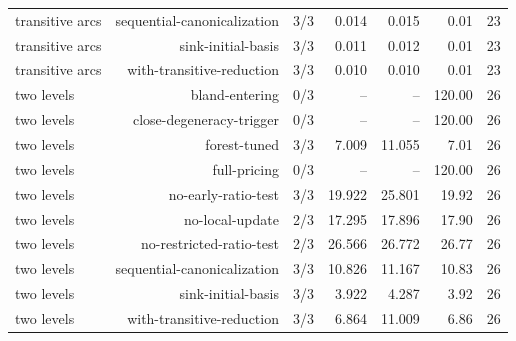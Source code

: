 {\begin{longtable}{lrrrrrr}
transitive arcs & sequential-canonicalization & 3/3 & 0.014 & 0.015 & 0.01 & 23 \\
transitive arcs & sink-initial-basis & 3/3 & 0.011 & 0.012 & 0.01 & 23 \\
transitive arcs & with-transitive-reduction & 3/3 & 0.010 & 0.010 & 0.01 & 23 \\
two levels & bland-entering & 0/3 & -- & -- & 120.00 & 26 \\
two levels & close-degeneracy-trigger & 0/3 & -- & -- & 120.00 & 26 \\
two levels & forest-tuned & 3/3 & 7.009 & 11.055 & 7.01 & 26 \\
two levels & full-pricing & 0/3 & -- & -- & 120.00 & 26 \\
two levels & no-early-ratio-test & 3/3 & 19.922 & 25.801 & 19.92 & 26 \\
two levels & no-local-update & 2/3 & 17.295 & 17.896 & 17.90 & 26 \\
two levels & no-restricted-ratio-test & 2/3 & 26.566 & 26.772 & 26.77 & 26 \\
two levels & sequential-canonicalization & 3/3 & 10.826 & 11.167 & 10.83 & 26 \\
two levels & sink-initial-basis & 3/3 & 3.922 & 4.287 & 3.92 & 26 \\
two levels & with-transitive-reduction & 3/3 & 6.864 & 11.009 & 6.86 & 26 \\
\end{longtable}
}

